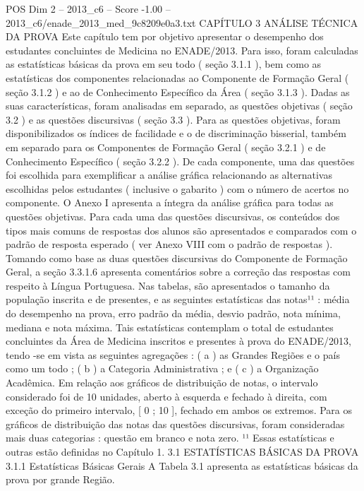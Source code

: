 \begin{textsample}{POS Dim 2 – 2013\_c6 – Score -1.00 – 2013\_c6/enade\_2013\_med\_9c8209e0a3.txt}  \label{ex:f2_pos_375}
CAPÍTULO 3 ANÁLISE TÉCNICA DA PROVA Este capítulo tem por objetivo apresentar o desempenho dos estudantes concluintes de Medicina no ENADE/2013.
Para isso, foram calculadas as estatísticas básicas da prova em seu todo ( seção 3.1.1 ), bem como as estatísticas dos componentes relacionadas ao Componente de Formação Geral ( seção 3.1.2 ) e ao de Conhecimento Específico da Área ( seção 3.1.3 ).
Dadas as suas características, foram analisadas em separado, as questões objetivas ( seção 3.2 ) e as questões discursivas ( seção 3.3 ).
Para as questões objetivas, foram disponibilizados os índices de facilidade e o de discriminação bisserial, também em separado para os Componentes de Formação Geral ( seção 3.2.1 ) e de Conhecimento Específico ( seção 3.2.2 ).
De cada componente, uma das questões foi escolhida para exemplificar a análise gráfica relacionando as alternativas escolhidas pelos estudantes ( inclusive o gabarito ) com o número de acertos no componente.
O Anexo I apresenta a íntegra da análise gráfica para todas as questões objetivas.
Para cada uma das questões discursivas, os conteúdos dos tipos mais comuns de respostas dos alunos são apresentados e comparados com o padrão de resposta esperado ( ver Anexo VIII com o padrão de respostas ).
Tomando como base as duas questões discursivas do Componente de Formação Geral, a seção 3.3.1.6 apresenta comentários sobre a correção das respostas com respeito à Língua Portuguesa.
Nas tabelas, são apresentados o tamanho da população inscrita e de presentes, e as seguintes estatísticas das notas¹¹ : média do desempenho na prova, erro padrão da média, desvio padrão, nota mínima, mediana e nota máxima.
Tais estatísticas contemplam o total de estudantes concluintes da Área de Medicina inscritos e presentes à prova do ENADE/2013, tendo -se em vista as seguintes agregações : ( a ) as Grandes Regiões e o país como um todo ; ( b ) a Categoria Administrativa ; e ( c ) a Organização Acadêmica.
Em relação aos gráficos de distribuição de notas, o intervalo considerado foi de 10 unidades, aberto à esquerda e fechado à direita, com exceção do primeiro intervalo, [ 0 ; 10 ], fechado em ambos os extremos.
Para os gráficos de distribuição das notas das questões discursivas, foram consideradas mais duas categorias : questão em branco e nota zero. ¹¹ Essas estatísticas e outras estão definidas no Capítulo 1. 3.1 ESTATÍSTICAS BÁSICAS DA PROVA 3.1.1 Estatísticas Básicas Gerais A Tabela 3.1 apresenta as estatísticas básicas da prova por grande Região.

\end{textsample}
